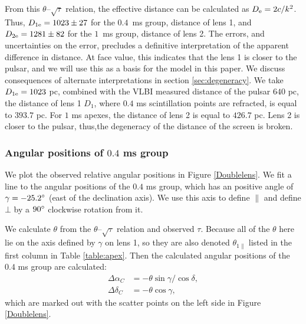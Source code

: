 \documentclass[useAMS,usenatbib]{mn2e}
\begin{document}
From this $\theta$--$\sqrt{\tau}$ relation, the effective distance can be calculated as $D_{\rm e}=2c/k^2$. Thus,
$D_{1{\rm e}}=1023\pm 27$ for the  $0.4$\ ms group, distance of lens 1, and
$D_{2{\rm e}} = 1281 \pm 82$ for the $1$\ ms group, distance of lens 2.
The errors, and uncertainties on the error, precludes a definitive
interpretation of the apparent difference in distance.  At face value, 
this indicates that the lens 1 is closer to the pulsar, and we will
use this as a basis for the model in this paper.  We discuss
consequences of alternate interpretations in section \ref{sec:degeneracy}.
We take $D_{1{\rm e}}=1023$ pc, combined with the VLBI measured distance of the pulsar $640$ pc, the distance of lens 1 $D_{1}$, where $0.4$ ms scintillation points are refracted, is equal to $393.7$ pc. For $1$ ms apexes, the distance of lens 2 is equal to $426.7$ pc. Lens 2 is closer to the pulsar, thus,the degeneracy of the distance of the screen is broken.

\subsubsection{Angular positions of $0.4$ ms group}
\label{subsec:angularpos}
We plot the observed relative angular positions in Figure \ref{Doublelens}. We fit a line to the angular positions of the $0.4$ ms group, which has an positive angle of $\gamma=-25.2\degree$ (east of the declination axis). We use this axis to define ${\parallel}$ and define ${\bot}$ by a $90\degree$ clockwise rotation from it. 

We calculate $\theta$ from the $\theta$--$\sqrt{\tau}$ relation and observed $\tau$. Because all of the $\theta$ here lie on the axis defined by $\gamma$ on lens 1, so they are also denoted $\theta_{1\parallel}$ listed in the first column in Table \ref{table:apex}. Then the calculated angular positions of the $0.4$ ms group are calculated:
\begin{equation}
\begin{aligned}
{\Delta\alpha_C}&=-\theta {\sin}\gamma/\cos{\delta}, \\
{\Delta\delta_C}&=-\theta {\cos}\gamma,
\end{aligned}
\end{equation}
which are marked out with the scatter points on the left side in Figure \ref{Doublelens}.
\end{document}
